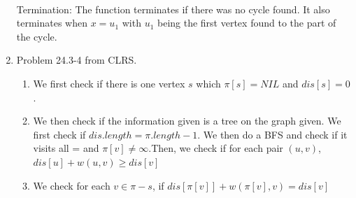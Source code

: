 \documentclass[letterpaper,11pt]{article}
\begin{document}
\begin{enumerate}
\\Termination: The function terminates if there was no cycle found. It also terminates when $x = u_1$ with $u_1$ being the first vertex found to the part of the cycle.
\item Problem 24.3-4 from CLRS.
\begin{enumerate}
\item We first check if there is one vertex $s$ which $\pi[s] = NIL$ and $dis[s] = 0$.
\item We then check if the information given is a tree on the graph given. We first check if $dis.length = \pi.length -1 $. We then do a BFS and check if it visits all = and $\pi[v] \neq \infty$.Then, we check if for each pair $(u,v)$, $dis[u] + w(u,v) \geq dis[v]$ 
\item We check for each $v \in \pi - s$, if $dis[\pi[v]] + w(\pi[v],v) = dis[v]$
\end{enumerate}
\end{enumerate}
\end{document}
